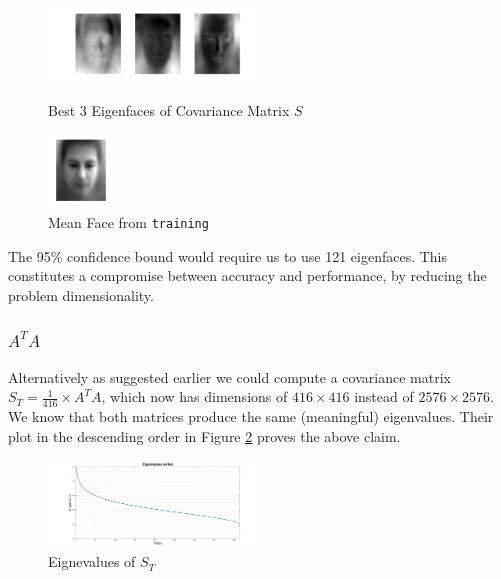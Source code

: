 \documentclass[10pt,twocolumn,letterpaper]{article}
\begin{document}
\begin{figure}[H]

\centering
\includegraphics[width=0.5\textwidth]{../results/Q1A_PCA_Eigenfaces}

  \caption{Best 3 Eigenfaces of Covariance Matrix $S$ \label{fig:Eig2}}

\centering
\includegraphics[width=0.15\textwidth]{../results/Q1A_PCA_Mean}

  \caption{Mean Face from {\tt\small training} \label{fig:Mean}}

\end{figure}


The 95\% confidence bound would require us to use 121 eigenfaces. This constitutes a compromise between accuracy and performance, by reducing the problem dimensionality.
\subsubsection{\boldmath$A^TA$} \label{sec:ata}
Alternatively as suggested earlier we could compute a covariance matrix $S_T = \frac{1}{416} \times A^TA$, which now has dimensions of $416 \times 416$ instead of $2576 \times 2576$. We know \cite{Data Mining} that both matrices produce the same (meaningful) eigenvalues. Their plot in the  descending order in Figure \ref{fig:Eig3} proves the above claim.

\begin{figure}[H]
\centering
\includegraphics[width=0.5\textwidth]{../results/Q1B_PCA_Eigenvalues}

  \caption{Eignevalues of $S_T$ \label{fig:Eig3}}

\end{figure}
\end{document}
